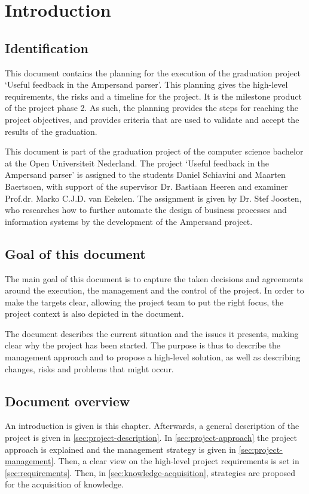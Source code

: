 \section{Introduction}
\subsection{Identification}
%
This document contains the planning for the execution of the graduation project `Useful feedback in the Ampersand parser'.
This planning gives the high-level requirements, the risks and a timeline for the project.
It is the milestone product of the project phase 2.
As such, the planning provides the steps for reaching the project objectives, and provides criteria that are used to validate and accept the results of the graduation.

This document is part of the graduation project of the computer science bachelor at the Open Universiteit Nederland.
The project `Useful feedback in the Ampersand parser' is assigned to the students Daniel Schiavini and Maarten Baertsoen, with support of the supervisor Dr. Bastiaan Heeren and examiner Prof.dr. Marko C.J.D. van Eekelen.
The assignment is given by Dr. Stef Joosten, who researches how to further automate the design of business processes and information systems by the development of the Ampersand project.

\subsection{Goal of this document}
The main goal of this document is to capture the taken decisions and agreements around the execution, the management and the control of the project.
In order to make the targets clear, allowing the project team to put the right focus, the project context is also depicted in the document.

The document describes the current situation and the issues it presents, making clear why the project has been started.
The purpose is thus to describe the management approach and to propose a high-level solution, as well as describing changes, risks and problems that might occur.

\subsection{Document overview}
An introduction is given is this chapter.
Afterwards, a general description of the project is given in \autoref{sec:project-description}.
In \autoref{sec:project-approach} the project approach is explained and the management strategy is given in \autoref{sec:project-management}.
Then, a clear view on the high-level project requirements is set in  \autoref{sec:requirements}.
Then, in \autoref{sec:knowledge-acquisition}, strategies are proposed for the acquisition of knowledge.

